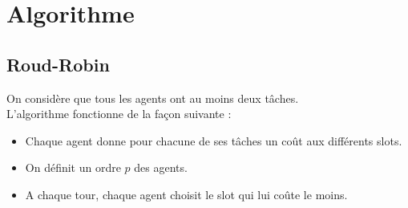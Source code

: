 \documentclass[12pt]{article}
\theoremstyle{definition}
\begin{document}
\section{Algorithme}
\subsection{Roud-Robin}
\noindent
On considère que tous les agents ont au moins deux tâches.\\
L'algorithme fonctionne de la façon suivante :
\begin{itemize}
	\item Chaque agent donne pour chacune de ses tâches un coût aux différents slots.
	\item On définit un ordre $p$ des agents.
	\item A chaque tour, chaque agent choisit le slot qui lui coûte le moins.
\end{itemize}
\end{document}

